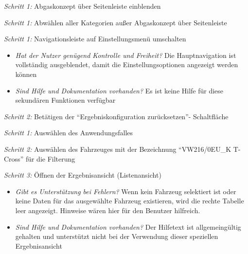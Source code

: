 \par
\textit{Schritt 1:} Abgaskonzept über Seitenleiste einblenden\par
{}\par
\textit{Schritt 1:} Abwählen aller Kategorien außer Abgaskonzept über Seitenleiste\par
{}\par
\textit{Schritt 1:} Navigationsleiste auf Einstellungsmenü umschalten\par
\begin{itemize}
 \item \textit{Hat der Nutzer genügend Kontrolle und Freiheit?} Die Hauptnavigation ist vollständig ausgeblendet, damit die Einstellungsoptionen angezeigt werden können\par
 \item \textit{Sind Hilfe und Dokumentation vorhanden?} Es ist keine Hilfe für diese sekundären Funktionen verfügbar\par
\end{itemize}
\textit{Schritt 2:} Betätigen der \enquote{Ergebniskonfiguration zurücksetzen}- Schaltfläche\par
{}\par
\textit{Schritt 1:} Auswählen des Anwendungsfalles\par
\textit{Schritt 2:} Auswählen des Fahrzeuges mit der Bezeichnung \enquote{VW216/0EU\_{}K T-Cross} für die Filterung\par
\textit{Schritt 3:} Öffnen der Ergebnisansicht (Listenansicht)\par
\begin{itemize}
 \item \textit{Gibt es Unterstützung bei Fehlern?} Wenn kein Fahrzeug selektiert ist oder keine Daten für das ausgewählte Fahrzeug existieren, wird die rechte Tabelle leer angezeigt. Hinweise wären hier für den Benutzer hilfreich.\par
 \item \textit{Sind Hilfe und Dokumentation vorhanden?} Der Hilfetext ist allgemeingültig gehalten und unterstützt nicht bei der Verwendung dieser speziellen Ergebnisansicht\par
\end{itemize}
